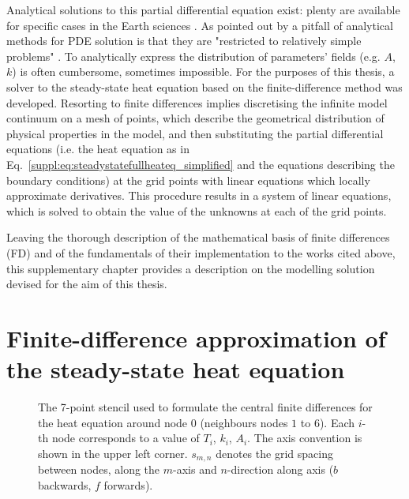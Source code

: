 Analytical solutions to this partial differential equation exist: plenty are available for specific cases in the Earth sciences \parencites(see e.g. )()[][chapter 4.6]{Turcotte2014_geodynamics}[][chapter 3.4]{stuwe2007geodynamics}.
As pointed out by \textcite{Gerya2010} a pitfall of analytical methods for PDE solution is that they are "restricted to relatively simple problems" \parencite[][chapter 3.1]{Gerya2010}.
To analytically express the distribution of parameters' fields (e.g. $A$, $k$) is often cumbersome, sometimes impossible.
For the purposes of this thesis, a solver to the steady-state heat equation based on the finite-difference method \parencites()()[][chapter 4.2]{Patankar1980}[][chapter 10]{Gerya2010} was developed.
Resorting to finite differences implies discretising the infinite model continuum on a mesh of points, which describe the geometrical distribution of physical properties in the model, and then substituting the partial differential equations (i.e. the heat equation as in Eq.~\ref{suppl:eq:steadystatefullheateq_simplified} and the equations describing the boundary conditions) at the grid points with linear equations which locally approximate derivatives.
This procedure results in a system of linear equations, which is solved to obtain the value of the unknowns at each of the grid points.

Leaving the thorough description of the mathematical basis of finite differences (FD) and of the fundamentals of their implementation to the works cited above, this supplementary chapter provides a description on the modelling solution devised for the aim of this thesis.

\section[
    tocentry={Finite-difference approximation of the steady-state heat equation},
    head={FD approximation of the steady-state heat equation}
    ]{Finite-difference approximation of the steady-state heat equation}
\label{s:ThermModel:FD}

\FloatBarrier

\begin{figure}[hb] %
    \begin{adjustbox}{center}
    \end{adjustbox}
    \caption[The 7-point stencil used to formulate the central finite differences.]{The 7-point stencil used to formulate the central finite differences for the heat equation around node $0$ (neighbours nodes $1$ to $6$).
    Each $i$-th node corresponds to a value of $T_i$, $k_i$, $A_i$.
    The axis convention is shown in the upper left corner.
    $s_{m,n}$ denotes the grid spacing between nodes, along the $m$-axis and $n$-direction along axis ($b$ backwards, $f$ forwards).}
    \label{suppl:fig:stencil}
\end{figure}

